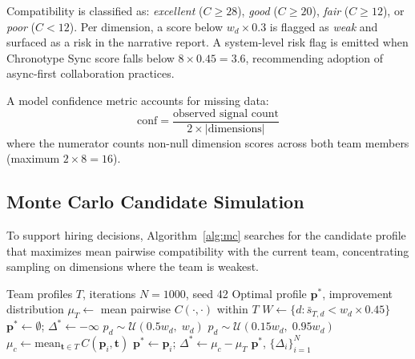 \documentclass[conference]{IEEEtran}
\begin{document}
Compatibility is classified as: \textit{excellent} ($C \geq 28$),
\textit{good} ($C \geq 20$), \textit{fair} ($C \geq 12$), or
\textit{poor} ($C < 12$).  Per dimension, a score below
$w_d \times 0.3$ is flagged as \textit{weak} and surfaced as a
risk in the narrative report.  A system-level risk flag is emitted
when Chronotype Sync score falls below $8 \times 0.45 = 3.6$,
recommending adoption of async-first collaboration practices.

A model confidence metric accounts for missing data:
\begin{equation}
  \text{conf} = \frac{\text{observed signal count}}{2 \times |\text{dimensions}|}
  \label{eq:conf}
\end{equation}
where the numerator counts non-null dimension scores across both
team members (maximum $2 \times 8 = 16$).

\subsection{Monte Carlo Candidate Simulation}

To support hiring decisions, Algorithm~\ref{alg:mc} searches for
the candidate profile that maximizes mean pairwise compatibility
with the current team, concentrating sampling on dimensions where
the team is weakest.

\begin{algorithm}[t]
\caption{Monte Carlo Candidate Simulation}
\label{alg:mc}
\begin{algorithmic}[1]
\REQUIRE Team profiles $T$, iterations $N{=}1000$, seed 42
\ENSURE Optimal profile $\mathbf{p}^*$, improvement distribution
\STATE $\mu_T \leftarrow$ mean pairwise $C(\cdot,\cdot)$ within $T$
\STATE $W \leftarrow \{d : \bar{s}_{T,d} < w_d \times 0.45\}$
\STATE $\mathbf{p}^* \leftarrow \emptyset$;\;
  $\Delta^* \leftarrow -\infty$
      $p_d \sim \mathcal{U}(0.5 w_d,\; w_d)$
    \ELSE
      \STATE $p_d \sim \mathcal{U}(0.15 w_d,\; 0.95 w_d)$
    \ENDIF
  \ENDFOR
  \STATE $\mu_c \leftarrow \mathrm{mean}_{\mathbf{t} \in T}\,C(\mathbf{p}_i, \mathbf{t})$
    \STATE $\mathbf{p}^* \leftarrow \mathbf{p}_i$;\;
      $\Delta^* \leftarrow \mu_c - \mu_T$
  \ENDIF
\ENDFOR
\RETURN $\mathbf{p}^*$, $\{\Delta_i\}_{i=1}^N$
\end{algorithmic}
\end{algorithm}
\end{document}
